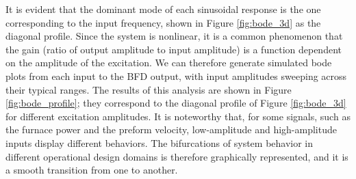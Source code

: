 It is evident that the dominant mode of each sinusoidal response is the one corresponding to the input frequency, shown in Figure \ref{fig:bode_3d} as the diagonal profile. Since the system is nonlinear, it is a common phenomenon that the gain (ratio of output amplitude to input amplitude) is a function dependent on the amplitude of the excitation. We can therefore generate simulated bode plots from each input to the BFD output, with input amplitudes sweeping across their typical ranges. The results of this analysis are shown in Figure \ref{fig:bode_profile}; they correspond to the diagonal profile of Figure \ref{fig:bode_3d} for different excitation amplitudes. It is noteworthy that, for some signals, such as the furnace power and the preform velocity, low-amplitude and high-amplitude inputs display different behaviors. The bifurcations of system behavior in different operational design domains is therefore graphically represented, and it is a smooth transition from one to another. 

